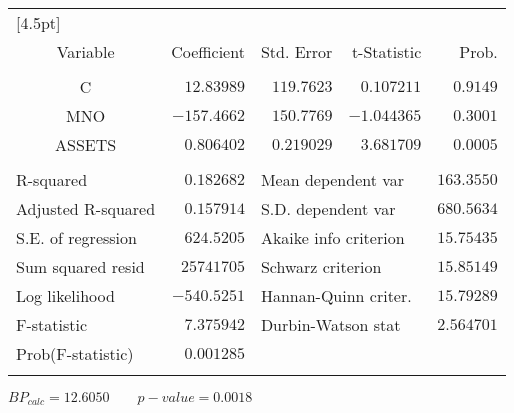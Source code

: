 \documentclass[12pt]{report}
\begin{document}
\begin{table}[H]
\begin{tabular}{lrrrr}
		[4.5pt] \hline \\ [-4.5pt]
		\multicolumn{1}{c}{Variable}&\multicolumn{1}{r}{Coefficient}&\multicolumn{1}{r}{Std. Error}&\multicolumn{1}{r}{t-Statistic}&\multicolumn{1}{r}{Prob.}\\
		[4.5pt] \hline \\ [-4.5pt]
		\multicolumn{1}{c}{C}&\multicolumn{1}{r}{$12.83989$}&\multicolumn{1}{r}{$119.7623$}&\multicolumn{1}{r}{$0.107211$}&\multicolumn{1}{r}{$0.9149$}\\
		\multicolumn{1}{c}{MNO}&\multicolumn{1}{r}{$-157.4662$}&\multicolumn{1}{r}{$150.7769$}&\multicolumn{1}{r}{$-1.044365$}&\multicolumn{1}{r}{$0.3001$}\\
		\multicolumn{1}{c}{ASSETS}&\multicolumn{1}{r}{$0.806402$}&\multicolumn{1}{r}{$0.219029$}&\multicolumn{1}{r}{$3.681709$}&\multicolumn{1}{r}{$0.0005$}\\
		[4.5pt] \hline \\ [-4.5pt]
		\multicolumn{1}{l}{R-squared}&\multicolumn{1}{r}{$0.182682$}&\multicolumn{2}{l}{Mean dependent var}&\multicolumn{1}{r}{$163.3550$}\\
		\multicolumn{1}{l}{Adjusted R-squared}&\multicolumn{1}{r}{$0.157914$}&\multicolumn{2}{l}{S.D. dependent var}&\multicolumn{1}{r}{$680.5634$}\\
		\multicolumn{1}{l}{S.E. of regression}&\multicolumn{1}{r}{$624.5205$}&\multicolumn{2}{l}{Akaike info criterion}&\multicolumn{1}{r}{$15.75435$}\\
		\multicolumn{1}{l}{Sum squared resid}&\multicolumn{1}{r}{$25741705$}&\multicolumn{2}{l}{Schwarz criterion}&\multicolumn{1}{r}{$15.85149$}\\
		\multicolumn{1}{l}{Log likelihood}&\multicolumn{1}{r}{$-540.5251$}&\multicolumn{2}{l}{Hannan-Quinn criter.}&\multicolumn{1}{r}{$15.79289$}\\
		\multicolumn{1}{l}{F-statistic}&\multicolumn{1}{r}{$7.375942$}&\multicolumn{2}{l}{Durbin-Watson stat}&\multicolumn{1}{r}{$2.564701$}\\
		\multicolumn{1}{l}{Prob(F-statistic)}&\multicolumn{1}{r}{$0.001285$}&\multicolumn{1}{c}{}&\multicolumn{1}{c}{}&\multicolumn{1}{c}{}\\
		[4.5pt] \hline \\ [-4.5pt]
	\end{tabular}
\end{table}
 
\centering
$BP_{calc} = 12.6050 \qquad p-value=0.0018$
\end{document}

